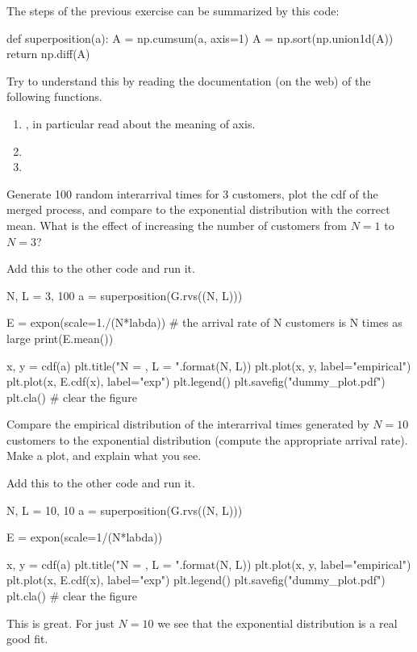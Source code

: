 \documentclass{scrartcl}
\begin{document}
\begin{exercise}
  The steps of the previous exercise can be summarized by this code:
\begin{pyverbatim}
def superposition(a):
    A = np.cumsum(a, axis=1)
    A = np.sort(np.union1d(A))
    return np.diff(A)

\end{pyverbatim}  

Try to understand this by reading the documentation (on the web) of the following functions.
\begin{enumerate}
\item {}, in particular read about the meaning of axis.
\item {}
\item {}
\end{enumerate}
\end{exercise}


\begin{exercise}
  Generate 100 random interarrival times for 3 customers, plot the cdf of the merged process, and compare to the exponential distribution with the correct mean. What is the effect of increasing the number of customers from $N=1$ to $N=3$?
\begin{solution}
Add this to the other code and run it. 
\begin{pyverbatim}
N, L = 3, 100
a = superposition(G.rvs((N, L)))

E = expon(scale=1./(N*labda)) # the arrival rate of N customers is N times as large
print(E.mean())

x, y = cdf(a)
plt.title("N = {}, L = {}".format(N, L))
plt.plot(x, y,  label="empirical")
plt.plot(x, E.cdf(x),  label="exp")
plt.legend()
plt.savefig("dummy_plot.pdf")
plt.cla() # clear the figure
\end{pyverbatim}

\end{solution}
\end{exercise}


\begin{exercise}
  Compare  the empirical distribution of the interarrival times generated by  $N=10$ customers to the exponential distribution (compute the appropriate arrival rate). Make a plot, and explain what you see.
\begin{solution}
Add this to the other code and run it. 
\begin{pyverbatim}
N, L = 10, 10
a = superposition(G.rvs((N, L)))

E = expon(scale=1/(N*labda))

x, y = cdf(a)
plt.title("N = {}, L = {}".format(N, L))
plt.plot(x, y,  label="empirical")
plt.plot(x, E.cdf(x),  label="exp")
plt.legend()
plt.savefig("dummy_plot.pdf")
plt.cla() # clear the figure
\end{pyverbatim}

This is great. For just $N=10$ we see that the exponential distribution is a real good fit. 
\end{solution}
\end{exercise}
\end{document}
